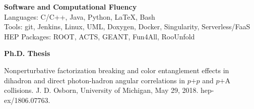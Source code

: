 \documentclass[11pt]{article}
\begin{document}
\vspace{3pt}
\begin{flushleft}
	\Large\textbf{Software and Computational Fluency} \\
	\normalsize
	Languages: C/C++, Java, Python, \LaTeX, Bash \\
	Tools: git, Jenkins, Linux, UML, Doxygen, Docker, Singularity, Serverless/FaaS\\
	HEP Packages: ROOT, ACTS, GEANT, Fun4All, RooUnfold
\end{flushleft}

\vspace{3pt}

\begin{flushleft}
\Large\textbf{Ph.D. Thesis} \\
\normalsize

		Nonperturbative factorization breaking and color entanglement effects in dihadron and direct photon-hadron angular correlations in $p$$+$$p$ and $p$$+$A collisions. J. D. Osborn, University of Michigan, May 29, 2018. hep-ex/1806.07763.
	
	\end{flushleft}





\end{document}
